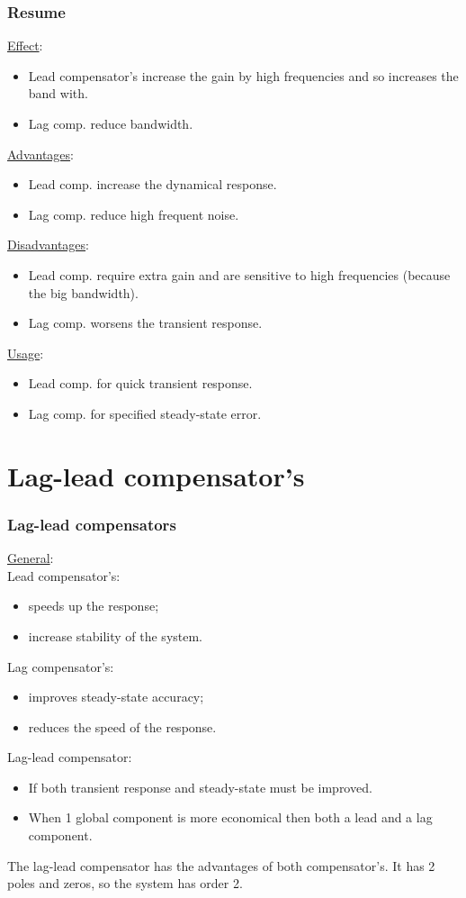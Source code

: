 \begin{frame}
	\frametitle{Resume}
	\underline{Effect}:
	\begin{itemize}
		\item Lead compensator's increase the gain by high frequencies and so increases the band with.
		\item Lag comp. reduce bandwidth.
	\end{itemize}
	\underline{Advantages}:
	\begin{itemize}
		\item Lead comp. increase the dynamical response.
		\item Lag comp. reduce high frequent noise.
	\end{itemize}
	\underline{Disadvantages}:
	\begin{itemize}
		\item Lead comp. require extra gain and are sensitive to high frequencies (because the big bandwidth).
		\item Lag comp. worsens the transient response.  
	\end{itemize}
	\underline{Usage}:
	\begin{itemize}
		\item Lead comp. for quick transient response.
		\item Lag comp. for specified steady-state error.
	\end{itemize}
\end{frame}

\section{Lag-lead compensator's}

\begin{frame}
	\frametitle{Lag-lead compensators}
		\underline{General}:\\
		Lead compensator's: 
		\begin{itemize}
			\item speeds up the response;
			\item increase stability of the system.
		\end{itemize}
		Lag compensator's:
		\begin{itemize}
			\item improves steady-state accuracy;
			\item reduces the speed of the response.
		\end{itemize}
		Lag-lead compensator:
		\begin{itemize}
			\item If both transient response and steady-state must be improved.
			\item When 1 global component is more economical then both a lead and a lag component.
		\end{itemize}
		The lag-lead compensator has the advantages of both compensator's. It has 2 poles and zeros, so the system has order 2.
\end{frame}

